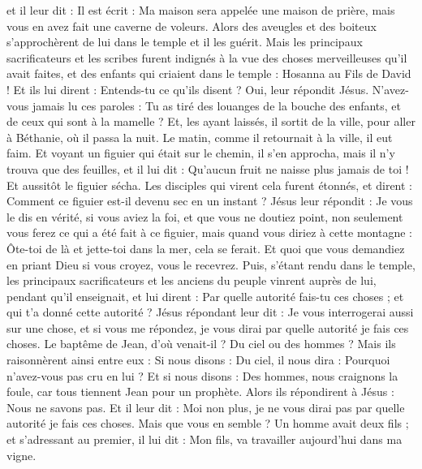 \begin{multicols}{2}
et il leur dit : Il est écrit : Ma maison sera appelée une maison de prière, mais vous en avez fait une caverne de voleurs.
Alors des aveugles et des boiteux s'approchèrent de lui dans le temple et il les guérit.
Mais les principaux sacrificateurs et les scribes furent indignés à la vue des choses merveilleuses qu'il avait faites, et des enfants qui criaient dans le temple : Hosanna au Fils de David !
Et ils lui dirent : Entends-tu ce qu'ils disent ? Oui, leur répondit Jésus. N'avez-vous jamais lu ces paroles : Tu as tiré des louanges de la bouche des enfants, et de ceux qui sont à la mamelle ?
Et, les ayant laissés, il sortit de la ville, pour aller à Béthanie, où il passa la nuit.
Le matin, comme il retournait à la ville, il eut faim.
Et voyant un figuier qui était sur le chemin, il s'en approcha, mais il n'y trouva que des feuilles, et il lui dit : Qu'aucun fruit ne naisse plus jamais de toi ! Et aussitôt le figuier sécha.
Les disciples qui virent cela furent étonnés, et dirent : Comment ce figuier est-il devenu sec en un instant ?
Jésus leur répondit : Je vous le dis en vérité, si vous aviez la foi, et que vous ne doutiez point, non seulement vous ferez ce qui a été fait à ce figuier, mais quand vous diriez à cette montagne : Ôte-toi de là et jette-toi dans la mer, cela se ferait.
Et quoi que vous demandiez en priant Dieu si vous croyez, vous le recevrez.
Puis, s'étant rendu dans le temple, les principaux sacrificateurs et les anciens du peuple vinrent auprès de lui, pendant qu'il enseignait, et lui dirent : Par quelle autorité fais-tu ces choses ; et qui t'a donné cette autorité ?
Jésus répondant leur dit : Je vous interrogerai aussi sur une chose, et si vous me répondez, je vous dirai par quelle autorité je fais ces choses.
Le baptême de Jean, d'où venait-il ? Du ciel ou des hommes ? Mais ils raisonnèrent ainsi entre eux : Si nous disons : Du ciel, il nous dira : Pourquoi n'avez-vous pas cru en lui ?
Et si nous disons : Des hommes, nous craignons la foule, car tous tiennent Jean pour un prophète.
Alors ils répondirent à Jésus : Nous ne savons pas. Et il leur dit : Moi non plus, je ne vous dirai pas par quelle autorité je fais ces choses.
Mais que vous en semble ? Un homme avait deux fils ; et s'adressant au premier, il lui dit : Mon fils, va travailler aujourd'hui dans ma vigne.

\end{multicols}
